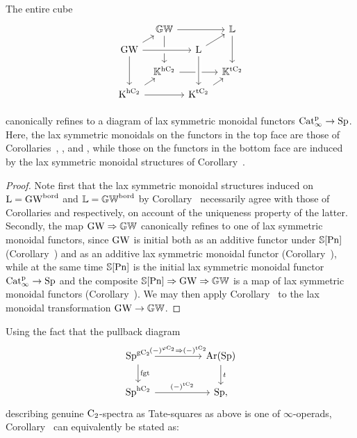 \begin{corollary}
\label{corollary:kgw-kl-monoidal}%
\label{corollary:GW-symmetric-monoidal}%
The entire cube
\[
\begin{tikzcd}
[column sep=0.5em, row sep=0.7em]
  & \KGW\ar[rr]\ar[dd] && \KL\ar[dd]\\
\GW\ar[ru]\ar[rr, crossing over]\ar[dd] && \L\ar[ur]\\
  & \KK^\hC\ar[rr] && \KK^\tC\\
\K^\hC\ar[rr] \ar[ru] && \K^\tC\ar[uu,<-, crossing over] \ar[ru]\\
\end{tikzcd}
\]
canonically refines to a diagram of lax symmetric monoidal functors $\mathrm{Cat}^{\mathrm p}_\infty \rightarrow \mathrm{Sp}$. Here, the lax symmetric monoidals on the functors in the top face are those of Corollaries~, 
\;,
 and 
\;, 
while those on the functors in the bottom face are induced by the lax symmetric monoidal structures of Corollary~. %
\end{corollary}
\begin{proof}
Note first that the lax symmetric monoidal structures induced on $\operatorname L = \operatorname{GW}^\mathrm{bord}$ and $\mathbb{L} = \mathbb{GW}^\mathrm{bord}$ by Corollary~ 
necessarily agree with those of Corollaries 
and  respectively, on account of the uniqueness property of the latter. %
Secondly, the map $\operatorname{GW} \Rightarrow \mathbb{GW}$ canonically refines to one of lax symmetric monoidal functors, since $\operatorname{GW}$ is initial both as an additive functor under $\mathbb{S}[\mathrm{Pn}]$ (Corollary~) and as an additive lax symmetric monoidal functor (Corollary~), while at the same time $\mathbb{S}[\mathrm{Pn}]$ is the initial lax symmetric monoidal functor $\mathrm{Cat}^{\mathrm p}_\infty \to \mathrm{Sp}$ and the composite $\mathbb{S}[\mathrm{Pn}] \Rightarrow \operatorname{GW} \Rightarrow \mathbb{GW}$ is a map of lax symmetric monoidal functors (Corollary~). We may then apply Corollary~ to the lax monoidal transformation $\operatorname{GW} \to \mathbb{GW}$.
\end{proof}
Using the fact that the pullback diagram
\[
\begin{tikzcd}
\Sp^\gCt \ar[rr,"{(-)^{\varphi\Ct} \Rightarrow (-)^\tC}"] \ar[d,"\mathrm{fgt}"] && \Ar(\Sp) \ar[d,"t"]\\
\Sp^\hC \ar[rr,"{(-)^\tC}"] && \Sp,
\end{tikzcd}
\]
describing genuine $\mathrm{C_2}$-spectra as Tate-squares as above is one of $\infty$-operads, Corollary~ can equivalently be stated as:


